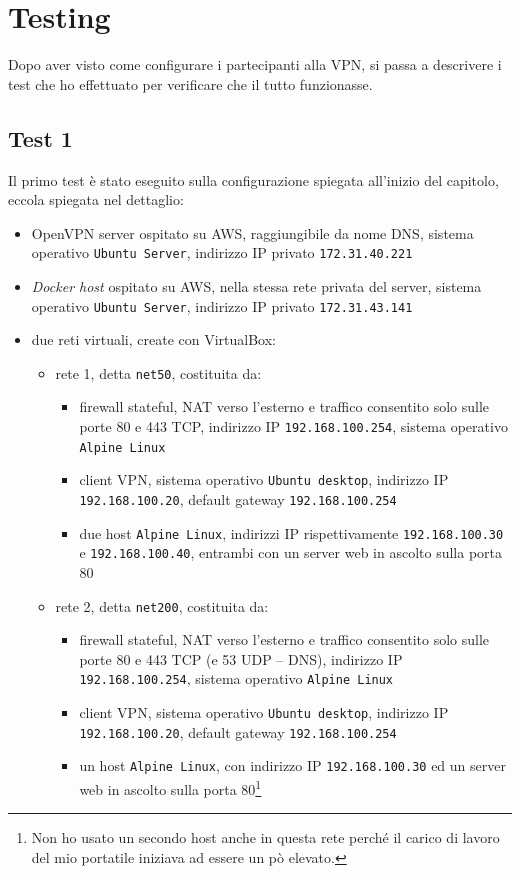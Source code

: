 \section{Testing}
Dopo aver visto come configurare i partecipanti alla VPN, si passa a descrivere
i test che ho effettuato per verificare che il tutto funzionasse.

\subsection{Test 1}
Il primo test è stato eseguito sulla configurazione spiegata all'inizio del capitolo,
eccola spiegata nel dettaglio:
\begin{itemize}
  \item OpenVPN server ospitato su AWS, raggiungibile da nome DNS, sistema
  operativo \texttt{Ubuntu Server}, indirizzo IP privato \texttt{172.31.40.221}
  \item \textit{Docker host} ospitato su AWS, nella stessa rete privata del
  server, sistema
  operativo \texttt{Ubuntu Server}, indirizzo IP privato \texttt{172.31.43.141}
  \item due reti virtuali, create con VirtualBox:
  \begin{itemize}
    \item rete 1, detta \texttt{net50}, costituita da:
    \begin{itemize}
      \item firewall stateful, NAT verso l'esterno e traffico consentito solo
      sulle porte 80 e 443 TCP, indirizzo IP \texttt{192.168.100.254},
      sistema operativo \texttt{Alpine Linux}
      \item client VPN, sistema operativo \texttt{Ubuntu desktop}, indirizzo
      IP \texttt{192.168.100.20}, default gateway \texttt{192.168.100.254}
      \item due host \texttt{Alpine Linux}, indirizzi IP rispettivamente
      \texttt{192.168.100.30} e \texttt{192.168.100.40}, entrambi con un server
      web in ascolto sulla porta 80
    \end{itemize}
    \item rete 2, detta \texttt{net200}, costituita da:
    \begin{itemize}
      \item firewall stateful, NAT verso l'esterno e traffico consentito solo
      sulle porte 80 e 443 TCP (e 53 UDP -- DNS), indirizzo IP
      \texttt{192.168.100.254},
      sistema operativo \texttt{Alpine Linux}
      \item client VPN, sistema operativo \texttt{Ubuntu desktop}, indirizzo
      IP \texttt{192.168.100.20}, default gateway \texttt{192.168.100.254}
      \item un host \texttt{Alpine Linux}, con indirizzo IP
      \texttt{192.168.100.30} ed un server
      web in ascolto sulla porta 80\footnote{Non ho usato un secondo host anche
      in questa rete perché il carico di lavoro del mio portatile iniziava ad
      essere un pò elevato.}
    \end{itemize}
  \end{itemize}
\end{itemize}
